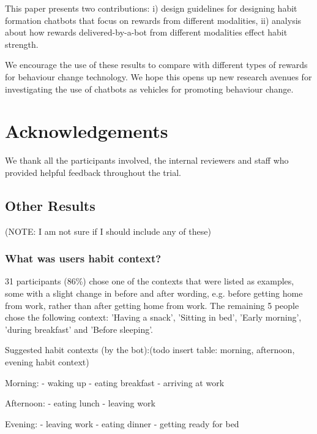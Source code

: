 \documentclass{scaffold/sigchi}
\begin{document}

This paper presents two contributions: i) design guidelines for designing habit formation chatbots that focus on rewards from different modalities, ii) analysis about how rewards delivered-by-a-bot from different modalities effect habit strength.

We encourage the use of these results to compare with different types of rewards for behaviour change technology. We hope this opens up new research avenues for investigating the use of chatbots as vehicles for promoting behaviour change.


\section{Acknowledgements}
We thank all the participants involved, the internal reviewers and staff who provided helpful feedback throughout the trial.


\subsection{Other Results}
(NOTE: I am not sure if I should include any of these)

\subsubsection{What was users habit context?}
31 participants (86\%) chose one of the contexts that were listed as examples, some with a slight change in before and after wording, e.g. before getting home from work, rather than after getting home from work. The remaining 5 people chose the following context: 'Having a snack', 'Sitting in bed', 'Early morning', 'during breakfast' and 'Before sleeping'.

Suggested habit contexts (by the bot):(todo insert table: morning, afternoon, evening habit context)

Morning:
  - waking up
  - eating breakfast
  - arriving at work

  Afternoon:
  - eating lunch
  - leaving work

  Evening:
  - leaving work
  - eating dinner
  - getting ready for bed
\end{document}
